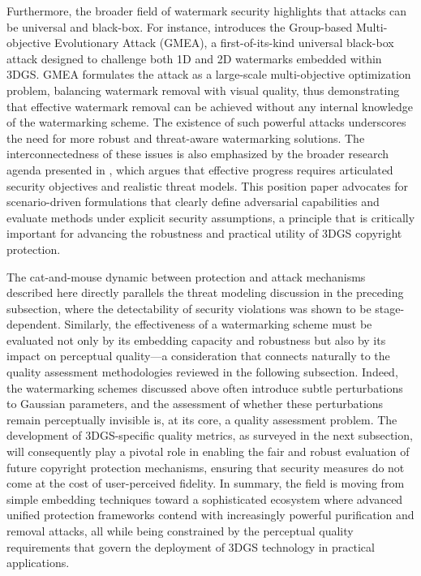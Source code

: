 \documentclass[11pt]{article}
\begin{document}
Furthermore, the broader field of watermark security highlights that attacks can be universal and black-box. For instance, \cite{ref731} introduces the Group-based Multi-objective Evolutionary Attack (GMEA), a first-of-its-kind universal black-box attack designed to challenge both 1D and 2D watermarks embedded within 3DGS. GMEA formulates the attack as a large-scale multi-objective optimization problem, balancing watermark removal with visual quality, thus demonstrating that effective watermark removal can be achieved without any internal knowledge of the watermarking scheme. The existence of such powerful attacks underscores the need for more robust and threat-aware watermarking solutions. The interconnectedness of these issues is also emphasized by the broader research agenda presented in \cite{ref732}, which argues that effective progress requires articulated security objectives and realistic threat models. This position paper advocates for scenario-driven formulations that clearly define adversarial capabilities and evaluate methods under explicit security assumptions, a principle that is critically important for advancing the robustness and practical utility of 3DGS copyright protection.

The cat-and-mouse dynamic between protection and attack mechanisms described here directly parallels the threat modeling discussion in the preceding subsection, where the detectability of security violations was shown to be stage-dependent. Similarly, the effectiveness of a watermarking scheme must be evaluated not only by its embedding capacity and robustness but also by its impact on perceptual quality---a consideration that connects naturally to the quality assessment methodologies reviewed in the following subsection. Indeed, the watermarking schemes discussed above often introduce subtle perturbations to Gaussian parameters, and the assessment of whether these perturbations remain perceptually invisible is, at its core, a quality assessment problem. The development of 3DGS-specific quality metrics, as surveyed in the next subsection, will consequently play a pivotal role in enabling the fair and robust evaluation of future copyright protection mechanisms, ensuring that security measures do not come at the cost of user-perceived fidelity. In summary, the field is moving from simple embedding techniques toward a sophisticated ecosystem where advanced unified protection frameworks contend with increasingly powerful purification and removal attacks, all while being constrained by the perceptual quality requirements that govern the deployment of 3DGS technology in practical applications.
\end{document}
